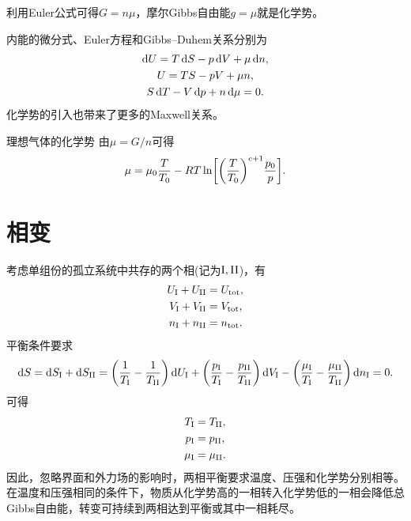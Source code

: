 \begin{corollary}
	利用Euler公式可得$G = n\mu$，摩尔Gibbs自由能$g = \mu$就是化学势。
\end{corollary}

\begin{corollary}
	内能的微分式、Euler方程和Gibbs--Duhem关系分别为
	\begin{subequations}
		\begin{gather}
			\mathop{}\!\mathrm{d} U = T\mathop{}\!\mathrm{d} S - p\mathop{}\!\mathrm{d} V + \mu\mathop{}\!\mathrm{d} n,\\
			U = TS - pV + \mu n,\\
			S\mathop{}\!\mathrm{d} T - V\mathop{}\!\mathrm{d} p + n\mathop{}\!\mathrm{d}\mu = 0.
		\end{gather}
	\end{subequations}
	化学势的引入也带来了更多的Maxwell关系。
\end{corollary}

\begin{example}
	{理想气体的化学势}{}
	由$\mu = G/n$可得
	\begin{equation}
		\mu = \mu_0\frac T{T_0} - RT\ln\biggl[\biggl(\frac T{T_0}\biggr)^{c+1}\frac{p_0}p\biggr].
	\end{equation}
\end{example}

\section{相变}
\label{sec:phase transition}

考虑单组份的孤立系统中共存的两个相(记为$\mathrm I,\mathrm{II}$)，有
\begin{align*}
	U_\mathrm I + U_{\mathrm{II}} &= U_{\mathrm{tot}},\\
	V_\mathrm I + V_{\mathrm{II}} &= V_{\mathrm{tot}},\\
	n_\mathrm I + n_{\mathrm{II}} &= n_{\mathrm{tot}}.
\end{align*}
平衡条件要求
\[
	\mathop{}\!\mathrm{d} S = \mathop{}\!\mathrm{d} S_\mathrm I + \mathop{}\!\mathrm{d} S_{\mathrm{II}}
	= \biggl(\frac1{T_\mathrm I} - \frac1{T_{\mathrm{II}}}\biggr)\mathop{}\!\mathrm{d} U_\mathrm I
	+ \biggl(\frac{p_\mathrm I}{T_\mathrm I} - \frac{p_{\mathrm{II}}}{T_{\mathrm{II}}}\biggr)\mathop{}\!\mathrm{d} V_\mathrm I
	- \biggl(\frac{\mu_\mathrm I}{T_\mathrm I} - \frac{\mu_{\mathrm{II}}}{T_{\mathrm{II}}}\biggr)\mathop{}\!\mathrm{d} n_\mathrm I
	= 0.
\]
可得
\begin{subequations}
	\begin{align}
		T_\mathrm I &= T_{\mathrm{II}},\\
		p_\mathrm I &= p_{\mathrm{II}},\\
		\mu_\mathrm I &= \mu_{\mathrm{II}}.
	\end{align}
\end{subequations}
因此，忽略界面和外力场的影响时，两相平衡要求温度、压强和化学势分别相等。在温度和压强相同的条件下，物质从化学势高的一相转入化学势低的一相会降低总Gibbs自由能，转变可持续到两相达到平衡或其中一相耗尽。

